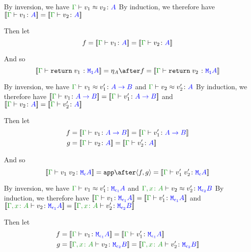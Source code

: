 \documentclass{report}
\begin{document}
By inversion, we have $\gberelation{v_1}{v_2}{A}$
By induction, we therefore have $\deno{\gtyperelation{v_1}{A}} = \deno{\gtyperelation{v_2}{A}}$

Then let
\begin{equation}
    f = \deno{\gtyperelation{v_1}{A}} = \deno{\gtyperelation{v_2}{A}}
\end{equation}

And so
\begin{equation}
    \deno{\gtyperelation{\return{v_1}}{\M{\1}{A}}} = \point{A}\after f = \deno{\gtyperelation{\return{v_2}}{\M{\1}{A}}}
\end{equation}


By inversion, we have $\gberelation{v_1}{v_1'}{\ab}$ and $\gberelation{v_2}{v_2'}{A}$
By induction, we therefore have $\deno{\gtyperelation{v_1}{\ab}}= \deno{\gtyperelation{v_1'}{\ab}}$ and $\deno{\gtyperelation{v_2}{A}} = \deno{\gtyperelation{v_2'}{A}}$

Then let
\begin{align}
    f &{}= \deno{\gtyperelation{v_1}{\ab}} = \deno{\gtyperelation{v_1'}{\ab}}\\
    g &{}= \deno{\gtyperelation{v_2}{A}} = \deno{\gtyperelation{v_2'}{A}}
\end{align}



And so
\begin{equation}
    \deno{\gtyperelation{\apply{v_1}{v_2}}{\M{\e}{A}}} = \app\after\pr{f}{g} = \deno{\gtyperelation{\apply{v_1'}{v_2'}}{\M{\e}{A}}}
\end{equation}


By inversion, we have $\gberelation{v_1}{v_1'}{\M{\e_1}{A}}$ and $\berelation{\gax}{v_2}{v_2'}{\M{\e_2}{B}}$
By induction, we therefore have $\deno{\gtyperelation{v_1}{\M{\e_1}{A}}}= \deno{\gtyperelation{v_1'}{\M{\e_1}{A}}}$ and $\deno{\typerelation{\gax}{v_2}{\M{\e_1}{A}}} = \deno{\typerelation{\gax}{v_2'}{\M{\e_2}{B}}}$

Then let
\begin{align}
    f &{}=\deno{\gtyperelation{v_1}{\M{\e_1}{A}}}= \deno{\gtyperelation{v_1'}{\M{\e_1}{A}}}\\
    g &{}=\deno{\typerelation{\gax}{v_2}{\M{\e_2}{B}}} = \deno{\typerelation{\gax}{v_2'}{\M{\e_2}{B}}}
\end{align}
\end{document}

